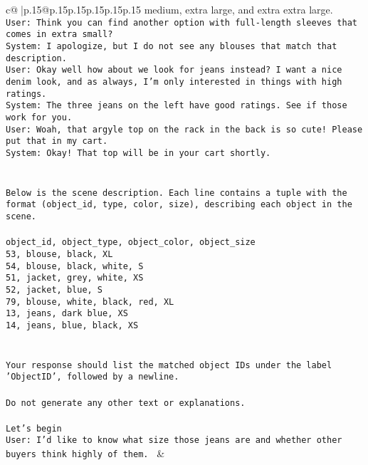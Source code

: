 \documentclass{article}
\begin{document}
{\begin{supertabular}{c@{$\;$}|p{.15\linewidth}@{}p{.15\linewidth}p{.15\linewidth}p{.15\linewidth}p{.15\linewidth}p{.15\linewidth}}
{{{medium, extra large, and extra extra large.\\ \tt User: Think you can find another option with full-length sleeves that comes in extra small?\\ \tt System: I apologize, but I do not see any blouses that match that description.\\ \tt User: Okay well how about we look for jeans instead? I want a nice denim look, and as always, I'm only interested in things with high ratings.\\ \tt System: The three jeans on the left have good ratings. See if those work for you.\\ \tt User: Woah, that argyle top on the rack in the back is so cute! Please put that in my cart.\\ \tt System: Okay! That top will be in your cart shortly.\\ \tt \\ \tt \\ \tt Below is the scene description. Each line contains a tuple with the format (object_id, type, color, size), describing each object in the scene.\\ \tt \\ \tt object_id, object_type, object_color, object_size\\ \tt 53, blouse, black, XL\\ \tt 54, blouse, black, white, S\\ \tt 51, jacket, grey, white, XS\\ \tt 52, jacket, blue, S\\ \tt 79, blouse, white, black, red, XL\\ \tt 13, jeans, dark blue, XS\\ \tt 14, jeans, blue, black, XS\\ \tt \\ \tt \\ \tt Your response should list the matched object IDs under the label 'ObjectID', followed by a newline.\\ \tt \\ \tt Do not generate any other text or explanations.\\ \tt \\ \tt Let's begin\\ \tt User: I'd like to know what size those jeans are and whether other buyers think highly of them. 
	  } 
	   } 
	   } 
	 & \\ 
 

    \theutterance {}  


\end{supertabular}}
\end{document}

